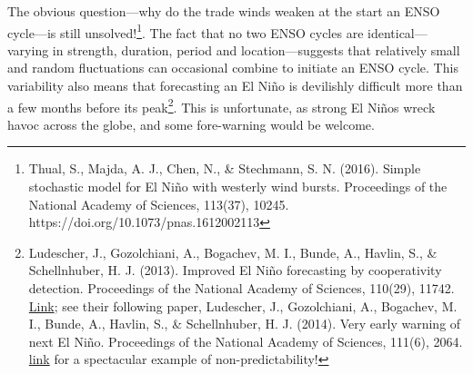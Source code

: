 {The obvious question---why do the trade winds weaken at the start an ENSO cycle---is still unsolved!\footnote{Thual, S., Majda, A. J., Chen, N., \& Stechmann, S. N. (2016). Simple stochastic model for El Ni\~no with westerly wind bursts. Proceedings of the National Academy of Sciences, 113(37), 10245. https://doi.org/10.1073/pnas.1612002113}. The fact that no two ENSO cycles are identical---varying in strength, duration, period and location---suggests that relatively small and random fluctuations can occasional combine to initiate an ENSO cycle. This variability also means that forecasting an El Ni\~no is devilishly difficult more than a few months before its peak\footnote{Ludescher, J., Gozolchiani, A., Bogachev, M. I., Bunde, A., Havlin, S., \& Schellnhuber, H. J. (2013). Improved El Ni\~no forecasting by cooperativity detection. Proceedings of the National Academy of Sciences, 110(29), 11742. \href{https://doi.org/10.1073/pnas.1309353110}{Link}; see their following paper, Ludescher, J., Gozolchiani, A., Bogachev, M. I., Bunde, A., Havlin, S., \& Schellnhuber, H. J. (2014). Very early warning of next El Ni\~no. Proceedings of the National Academy of Sciences, 111(6), 2064. \href{https://doi.org/10.1073/pnas.1323058111}{link} for a spectacular example of non-predictability!}. This is unfortunate, as strong El Ni\~nos wreck havoc across the globe, and some fore-warning would be welcome. 
}
